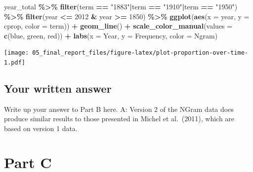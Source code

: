 \documentclass[
]{article}
\newenvironment{Shaded}{\begin{snugshade}}{\end{snugshade}}
\newcommand{\AttributeTok}[1]{\textcolor[rgb]{0.13,0.29,0.53}{#1}}
\newcommand{\DecValTok}[1]{\textcolor[rgb]{0.00,0.00,0.81}{#1}}
\newcommand{\FunctionTok}[1]{\textcolor[rgb]{0.13,0.29,0.53}{\textbf{#1}}}
\newcommand{\NormalTok}[1]{#1}
\newcommand{\SpecialCharTok}[1]{\textcolor[rgb]{0.81,0.36,0.00}{\textbf{#1}}}
\newcommand{\StringTok}[1]{\textcolor[rgb]{0.31,0.60,0.02}{#1}}
\begin{document}
\begin{Shaded}
\begin{Highlighting}[]
\NormalTok{year\_total }\SpecialCharTok{\%\textgreater{}\%}
  \FunctionTok{filter}\NormalTok{(term }\SpecialCharTok{==} \StringTok{"1883"}\SpecialCharTok{|}\NormalTok{term }\SpecialCharTok{==} \StringTok{"1910"}\SpecialCharTok{|}\NormalTok{term }\SpecialCharTok{==} \StringTok{"1950"}\NormalTok{) }\SpecialCharTok{\%\textgreater{}\%} 
  \FunctionTok{filter}\NormalTok{(year }\SpecialCharTok{\textless{}=} \DecValTok{2012} \SpecialCharTok{\&}\NormalTok{ year }\SpecialCharTok{\textgreater{}=} \DecValTok{1850}\NormalTok{) }\SpecialCharTok{\%\textgreater{}\%} 
  \FunctionTok{ggplot}\NormalTok{(}\FunctionTok{aes}\NormalTok{(}\AttributeTok{x =}\NormalTok{ year, }\AttributeTok{y =}\NormalTok{ cprop, }\AttributeTok{color =}\NormalTok{ term)) }\SpecialCharTok{+}
  \FunctionTok{geom\_line}\NormalTok{() }\SpecialCharTok{+}
  \FunctionTok{scale\_color\_manual}\NormalTok{(}\AttributeTok{values =} \FunctionTok{c}\NormalTok{(}\StringTok{\textquotesingle{}blue\textquotesingle{}}\NormalTok{, }\StringTok{\textquotesingle{}green\textquotesingle{}}\NormalTok{, }\StringTok{\textquotesingle{}red\textquotesingle{}}\NormalTok{)) }\SpecialCharTok{+}
  \FunctionTok{labs}\NormalTok{(}\AttributeTok{x =} \StringTok{\textquotesingle{}Year\textquotesingle{}}\NormalTok{, }\AttributeTok{y =} \StringTok{\textquotesingle{}Frequency\textquotesingle{}}\NormalTok{, }\AttributeTok{color =} \StringTok{\textquotesingle{}Ngram\textquotesingle{}}\NormalTok{)}
\end{Highlighting}
\end{Shaded}

\texttt{[image: 05\_final\_report\_files/figure-latex/plot-proportion-over-time-1.pdf]}

\hypertarget{your-written-answer-1}{%
\subsection{Your written answer}\label{your-written-answer-1}}

Write up your answer to Part B here. A: Version 2 of the NGram data does
produce similar results to those presented in Michel et al.~(2011),
which are based on version 1 data.

\hypertarget{part-c}{%
\section{Part C}\label{part-c}}
\end{document}
